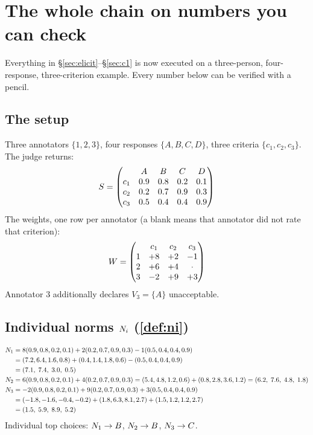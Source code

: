 \section{The whole chain on numbers you can check}
\label{sec:toy}

Everything in §\ref{sec:elicit}--§\ref{sec:c1} is now executed on a
three-person, four-response, three-criterion example. Every number below can be
verified with a pencil.

\subsection{The setup}

Three annotators $\{1,2,3\}$, four responses $\{A,B,C,D\}$, three criteria
$\{c_1,c_2,c_3\}$. The judge returns:
\[
S=\begin{pmatrix}
 & A & B & C & D\\
c_1 & 0.9 & 0.8 & 0.2 & 0.1\\
c_2 & 0.2 & 0.7 & 0.9 & 0.3\\
c_3 & 0.5 & 0.4 & 0.4 & 0.9
\end{pmatrix}
\]
The weights, one row per annotator (a blank means that annotator did not rate
that criterion):
\[
W=\begin{pmatrix}
 & c_1 & c_2 & c_3\\
1 & +8 & +2 & -1\\
2 & +6 & +4 & \cdot\\
3 & -2 & +9 & +3
\end{pmatrix}
\]
Annotator $3$ additionally declares $V_3 = \{A\}$ unacceptable.

\subsection{Individual norms $N_i$ (\cref{def:ni})}

\begin{align*}
N_1 &= 8(0.9,0.8,0.2,0.1)+2(0.2,0.7,0.9,0.3)-1(0.5,0.4,0.4,0.9)\\
      &= (7.2,6.4,1.6,0.8)+(0.4,1.4,1.8,0.6)-(0.5,0.4,0.4,0.9)\\
      &= (7.1,\;7.4,\;3.0,\;0.5)\\
N_2 &= 6(0.9,0.8,0.2,0.1)+4(0.2,0.7,0.9,0.3)
       = (5.4,4.8,1.2,0.6)+(0.8,2.8,3.6,1.2) = (6.2,\;7.6,\;4.8,\;1.8)\\
N_3 &= -2(0.9,0.8,0.2,0.1)+9(0.2,0.7,0.9,0.3)+3(0.5,0.4,0.4,0.9)\\
      &= (-1.8,-1.6,-0.4,-0.2)+(1.8,6.3,8.1,2.7)+(1.5,1.2,1.2,2.7)\\
      &= (1.5,\;5.9,\;8.9,\;5.2)
\end{align*}
Individual top choices: $N_1 \to B$, $N_2 \to B$, $N_3 \to C$.

